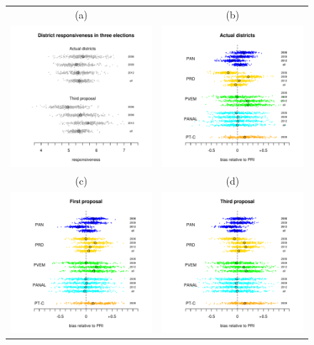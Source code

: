 \documentclass[letter,12pt]{article}
\begin{document}
\begin{figure}
\begin{center}
  \begin{tabular}{cc}
    (a) & (b) \\
    \includegraphics[width=.45\columnwidth]{../graphs/resp200612s0s3.pdf} &
    \includegraphics[width=.45\columnwidth]{../graphs/bias200612s0.pdf} \\
    (c) & (d) \\
    \includegraphics[width=.45\columnwidth]{../graphs/bias200612s1.pdf} &
    \includegraphics[width=.45\columnwidth]{../graphs/bias200612s3.pdf} 

\end{tabular}
\end{center}
\end{figure}
\end{document}

